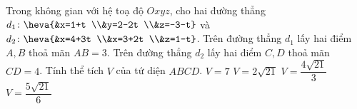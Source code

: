 \begin{ex}%
Trong không gian với hệ toạ độ $Oxyz$, cho hai đường thẳng $d_1\colon \heva{&x=1+t \\&y=2-2t \\&z=-3-t}$ và $d_2\colon \heva{&x=4+3t \\&x=3+2t \\&z=1-t}$. Trên đường thẳng $d_1$ lấy hai điểm $A,B$ thoả mãn $AB=3$. Trên đường thẳng $d_2$ lấy hai điểm $C,D$ thoả mãn $CD=4$. Tính thể tích $V$ của tứ diện $ABCD$.
\choice
{$V=7$}
{\True $V=2\sqrt{21}$}
{$V=\dfrac{4\sqrt{21}}{3}$}
{$V=\dfrac{5\sqrt{21}}{6}$}
\end{ex}

